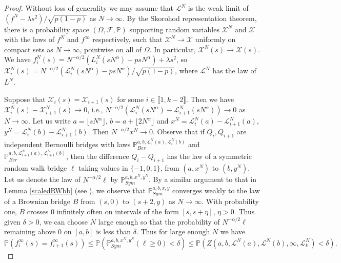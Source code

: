\begin{proof}
	Without loss of generality we may assume that $\mathcal{L}^N$ is the weak limit of $(f^N - \lambda s^2)/\sqrt{p(1-p)}$ as $N\to\infty$. By the Skorohod representation theorem, there is a probability space $(\Omega,\mathcal{F},\mathbb{P})$ supporting random variables $\mathcal{X}^N$ and $\mathcal{X}$ with the laws of $f^N$ and $f^\infty$ respectively, such that $\mathcal{X}^N \to \mathcal{X}$ uniformly on compact sets as $N\to\infty$, pointwise on all of $\Omega$. In particular, $\mathcal{X}^N(s) \to \mathcal{X}(s)$. We have $f^N_i(s) = N^{-\alpha/2}(L^N_i(sN^\alpha) - psN^\alpha) + \lambda s^2$, so $\mathcal{X}^N_i(s) = N^{-\alpha/2}(\mathcal{L}^N_i(sN^\alpha) - psN^\alpha)/\sqrt{p(1-p)}$, where $\mathcal{L}^N$ has the law of $L^N$.
	
	Suppose that $\mathcal{X}_i(s) = \mathcal{X}_{i+1}(s)$ for some $i\in\llbracket 1,k-2\rrbracket$. Then we have $\mathcal{X}_i^N(s) - \mathcal{X}^N_{i+1}(s) \to 0$, i.e., $N^{-\alpha/2}(\mathcal{L}_i^N(sN^\alpha) - \mathcal{L}^N_{i+1}(sN^\alpha))\to 0$ as $N\to\infty$. Let us write $a = \lfloor sN^\alpha\rfloor$, $b = a + \lfloor 2N^\alpha\rfloor$ and $x^N = \mathcal{L}_i^N(a) - \mathcal{L}_{i+1}^N(a)$, $y^N = \mathcal{L}_i^N(b) - \mathcal{L}_{i+1}^N(b)$. Then $N^{-\alpha/2}x^N\to 0$. Observe that if $Q_i,Q_{i+1}$ are independent Bernoulli bridges with laws $\mathbb{P}^{a,b,\mathcal{L}_i^N(a),\mathcal{L}_i^N(b)}_{Ber}$ and $\mathbb{P}^{a,b,\mathcal{L}_{i+1}^N(a),\mathcal{L}_{i+1}^N(b)}_{Ber}$, then the difference $Q_i - Q_{i+1}$ has the law of a symmetric random walk bridge $\ell$ taking values in $\{-1,0,1\}$, from $(a,x^N)$ to $(b,y^N)$. Let us denote the law of $N^{-\alpha/2}\ell$ by $\mathbb{P}^{a,b,x^N,y^N}_{Sym}$. By a similar argument to that in Lemma \ref{scaledRWbb} (see \cite[Lemma 5.3]{DimMat}), we observe that $\mathbb{P}^{a,b,x,y}_{Sym}$ converges weakly to the law of a Brownian bridge $B$ from $(s,0)$ to $(s+2,y)$ as $N\to\infty$. With probability one, $B$ crosses 0 infinitely often on intervals of the form $[s,s+\eta]$, $\eta > 0$. Thus given $\delta > 0$, we can choose $N$ large enough so that the probability of $N^{-\alpha/2}\ell$ remaining above 0 on $[a,b]$ is less than $\delta$. Thus for large enough $N$ we have
	\begin{equation}\label{collideAP}
		\mathbb{P}\left(f_i^\infty(s) = f_{i+1}^\infty(s)\right) \leq \mathbb{P}\left(\mathbb{P}^{a,b,x^N,y^N}_{Sym}(\ell \geq 0) < \delta\right) \leq \mathbb{P}\left(Z(a,b,\mathcal{L}^N(a),\mathcal{L}^N(b),\infty,\mathcal{L}^N_k) < \delta\right).

\end{equation}
\end{proof}
